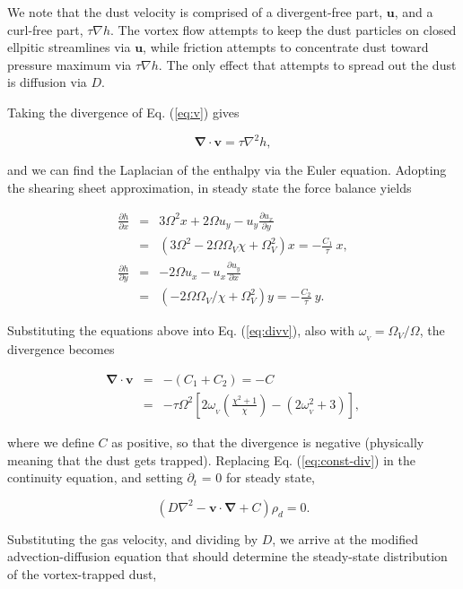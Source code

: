 \documentclass[apj]{emulateapj}
\newcommand{\pderiv}[2]{\frac{\partial #1}{\partial #2}}
\renewcommand{\v}[1]{{\boldsymbol{#1}}} %
\newcommand{\del}{\v{\nabla}}
\newcommand{\Div}{\del\cdot}
\newcommand{\Laplace}{\nabla^2}
\newcommand{\Eq}[1]{Eq. (\ref{#1})}
\newcommand{\eq}[1]{\Eq{#1}}
\newcommand{\beq}{\begin{equation}}
\newcommand{\eeq}{\end{equation}}
\newcommand{\beqn}{\begin{eqnarray}}
\newcommand{\eeqn}{\end{eqnarray}}
\begin{document}
We note that the dust
velocity is comprised of a divergent-free part, $\v{u}$, and a
curl-free part, $\tau\nabla{h}$. The vortex flow attempts to keep the
dust particles on closed ellpitic streamlines via $\v{u}$, while friction
attempts to concentrate dust toward pressure maximum via $\tau\nabla
h$. The only effect that attempts to spread out the dust is diffusion
via $D$.  

Taking the divergence of
\eq{eq:v} gives 

\beq
\Div{\v{v}} = \tau \Laplace{h}, 
\label{eq:divv}
\eeq

\noindent and we can find the Laplacian of the enthalpy via the Euler
equation. Adopting the shearing sheet approximation, in steady state
the force balance yields  

\begin{eqnarray}
\pderiv{h}{x} &=& 3\varOmega^2 x + 2\varOmega u_y -
u_y\pderiv{u_x}{y} \nonumber \\
&=& \left(3\varOmega^2 - 2\Omega\Omega_V \chi + \varOmega_V^2\right) x
= -\frac{C_1}{\tau} \  x,  \\
\pderiv{h}{y} &=& - 2\varOmega u_x -
u_x\pderiv{u_y}{x} \nonumber \\
&=& \left(-2\Omega\Omega_V/\chi + \Omega_V^2\right) y = -\frac{C_2}{\tau} \  y.
\end{eqnarray}

\noindent  Substituting the equations above into \eq{eq:divv}, also
with $\omega_{_V}=\varOmega_V/\varOmega$, the divergence becomes 

\beqn
\Div{\v{v}} &=& -(C_1+C_2) = - C \label{eq:const-div}\\
&=& - \tau\varOmega^2
\left[2\omega_{_V}\left(\frac{\chi^2+1}{\chi}\right) - (2\omega_{_V}^2
  + 3) \right], 
\label{eq:scale-div}
\eeqn

\noindent where we define $C$ as positive, so that the divergence is negative (physically meaning that the dust gets trapped). Replacing \eq{eq:const-div} in the continuity equation, and setting $\partial_t$ =
0 for steady state, 

\beq
\left(D\Laplace{} -  \v{v}\cdot\del  + C\right)\rho_d = 0. 
\label{eq:steady}
\eeq

Substituting the gas velocity, and dividing by $D$, we
arrive at the modified advection-diffusion equation that should
determine the steady-state distribution of the vortex-trapped dust, 

\end{document}
